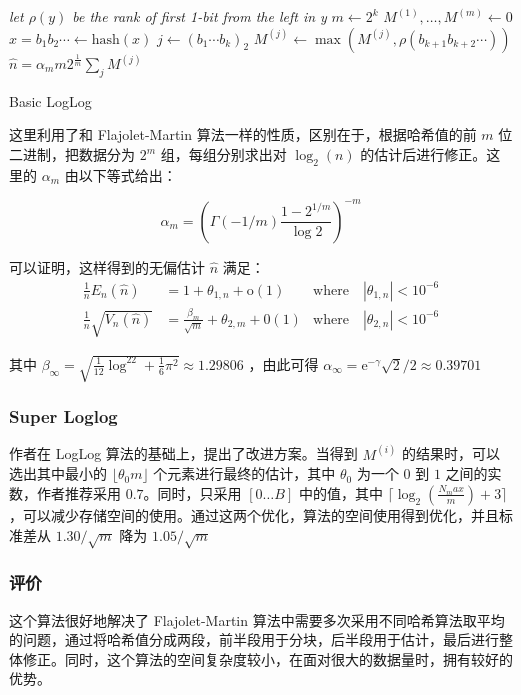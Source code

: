 \documentclass{ctexart}
\begin{document}
    \begin{algorithm}
        \BlankLine
        \emph{let $\rho(y)$ be the rank of first 1-bit from the left in y}\;
        $m \leftarrow 2^k$\;
        $M^{(1)},\ldots ,M^{(m)} \leftarrow 0$\;
         {
            $x = b_1b_2 \cdots \leftarrow \mathrm{hash}(x)$\;
            $j \leftarrow (b_1\cdots b_k)_2$\;
            $M^{(j)} \leftarrow \max(M^{(j)}, \rho(b_{k+1}b_{k+2}\cdots))$\;
        }
        $\hat{n} = \alpha_mm2^{\frac1m}\sum_j{M^{(j)}}$\;
        \caption{Basic LogLog}
    \end{algorithm}

    这里利用了和 Flajolet-Martin 算法一样的性质，区别在于，根据哈希值的前 $m$ 位二进制，把数据分为 $2^m$ 组，每组分别求出对 $\log_2(n)$ 的估计后进行修正。这里的 $\alpha_m$ 由以下等式给出：

    \begin{equation*}
        \alpha_m = (\Gamma(-1/m)\frac{1-2^{1/m}}{\log{2}})^{-m}
    \end{equation*}

    可以证明\cite{Durand:2003je}，这样得到的无偏估计 $\hat{n}$ 满足：
    \begin{align*}
        \frac1nE_n(\hat{n}) &= 1 + \theta_{1,n}+\mathrm{o}(1) & \mathrm{where} \quad |\theta_{1,n}| < 10^{-6} \\
        \frac1n\sqrt{V_n(\hat{n})} &= \frac{\beta_m}{\sqrt{m}} + \theta_{2,m} + \mathrm{0}(1) & \mathrm{where} \quad |\theta_{2,n}| < 10^{-6}
    \end{align*}

    其中 $\beta_{\infty} = \sqrt{\frac1{12}\log^22+\frac16\pi^2} \approx 1.29806$ ，由此可得 $\alpha_{\infty} = \mathrm{e}^{-\gamma}\sqrt2/2 \approx 0.39701$

\subsubsection{Super Loglog}
    作者在 LogLog 算法的基础上，提出了改进方案。当得到 $M^{(i)}$ 的结果时，可以选出其中最小的 $\lfloor \theta_0 m \rfloor$ 个元素进行最终的估计，其中 $\theta_0$ 为一个 $0$ 到 $1$ 之间的实数，作者推荐采用 $0.7$。同时，只采用 $[0 \ldots B]$ 中的值，其中 $\lceil \log_2(\frac{N_max}m)+3 \rceil$ ，可以减少存储空间的使用。通过这两个优化，算法的空间使用得到优化，并且标准差从 $1.30/\sqrt{m}$ 降为 $1.05/\sqrt{m}$ 

\subsubsection{评价}
    这个算法很好地解决了 Flajolet-Martin 算法中需要多次采用不同哈希算法取平均的问题，通过将哈希值分成两段，前半段用于分块，后半段用于估计，最后进行整体修正。同时，这个算法的空间复杂度较小，在面对很大的数据量时，拥有较好的优势。

\printbibliography[title=引用文献]
\end{document}
